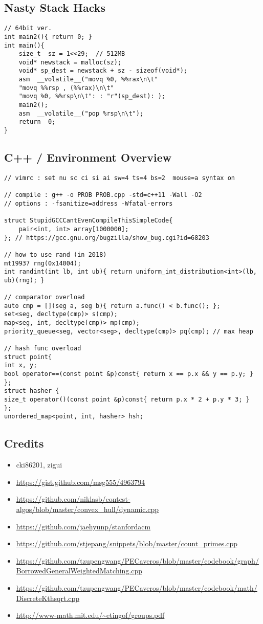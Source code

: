 \documentclass[landscape, 8pt, a4paper, oneside, twocolumn]{extarticle}
\begin{document}
\subsection {Nasty Stack Hacks}
\begin{verbatim}
// 64bit ver.
int main2(){ return 0; }
int main(){
	size_t  sz = 1<<29;  // 512MB
	void* newstack = malloc(sz);
	void* sp_dest = newstack + sz - sizeof(void*);
	asm  __volatile__("movq %0, %%rax\n\t"
	"movq %%rsp , (%%rax)\n\t"
	"movq %0, %%rsp\n\t": : "r"(sp_dest): );
	main2();
	asm  __volatile__("pop %rsp\n\t");
	return  0;
}
\end{verbatim}
\subsection {C++ / Environment Overview}
\begin{verbatim}
// vimrc : set nu sc ci si ai sw=4 ts=4 bs=2  mouse=a syntax on

// compile : g++ -o PROB PROB.cpp -std=c++11 -Wall -O2
// options : -fsanitize=address -Wfatal-errors

struct StupidGCCCantEvenCompileThisSimpleCode{
	pair<int, int> array[1000000];
}; // https://gcc.gnu.org/bugzilla/show_bug.cgi?id=68203

// how to use rand (in 2018)
mt19937 rng(0x14004);
int randint(int lb, int ub){ return uniform_int_distribution<int>(lb, ub)(rng); }

// comparator overload
auto cmp = [](seg a, seg b){ return a.func() < b.func(); };
set<seg, decltype(cmp)> s(cmp);
map<seg, int, decltype(cmp)> mp(cmp);
priority_queue<seg, vector<seg>, decltype(cmp)> pq(cmp); // max heap

// hash func overload
struct point{
int x, y;
bool operator==(const point &p)const{ return x == p.x && y == p.y; }
};
struct hasher {
size_t operator()(const point &p)const{ return p.x * 2 + p.y * 3; }
};
unordered_map<point, int, hasher> hsh;

\end{verbatim}
\subsection {Credits}
\begin{itemize}[noitemsep,nolistsep]
	\item cki86201, zigui
	\item \url{https://gist.github.com/msg555/4963794}
	\item \url{https://github.com/niklasb/contest-algos/blob/master/convex_hull/dynamic.cpp}
	\item \url{https://github.com/jaehyunp/stanfordacm}
	\item \url{https://github.com/stjepang/snippets/blob/master/count_primes.cpp}
	\item \url{https://github.com/tzupengwang/PECaveros/blob/master/codebook/graph/BorrowedGeneralWeightedMatching.cpp}
	\item \url{https://github.com/tzupengwang/PECaveros/blob/master/codebook/math/DiscreteKthsqrt.cpp}
	\item \url{http://www-math.mit.edu/~etingof/groups.pdf}
\end{itemize}
\end{document}
